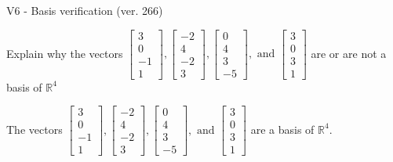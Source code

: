\begin{exercise}
  \begin{exerciseTitle}V6 - Basis verification (ver. 266)\end{exerciseTitle}
  \begin{exerciseStatement}
    Explain why the vectors \(\left[\begin{array}{r}
3 \\
0 \\
-1 \\
1
\end{array}\right] , \left[\begin{array}{r}
-2 \\
4 \\
-2 \\
3
\end{array}\right] , \left[\begin{array}{r}
0 \\
4 \\
3 \\
-5
\end{array}\right] , \text{ and } \left[\begin{array}{r}
3 \\
0 \\
3 \\
1
\end{array}\right]\) are or are not a basis of \(\mathbb{R}^4\)	


  \end{exerciseStatement}
  \begin{exerciseAnswer}
   The vectors \(\left[\begin{array}{r}
3 \\
0 \\
-1 \\
1
\end{array}\right] , \left[\begin{array}{r}
-2 \\
4 \\
-2 \\
3
\end{array}\right] , \left[\begin{array}{r}
0 \\
4 \\
3 \\
-5
\end{array}\right] , \text{ and } \left[\begin{array}{r}
3 \\
0 \\
3 \\
1
\end{array}\right]\) 
  	 are  a basis of \(\mathbb{R}^4\).
  


  \end{exerciseAnswer}
\end{exercise}